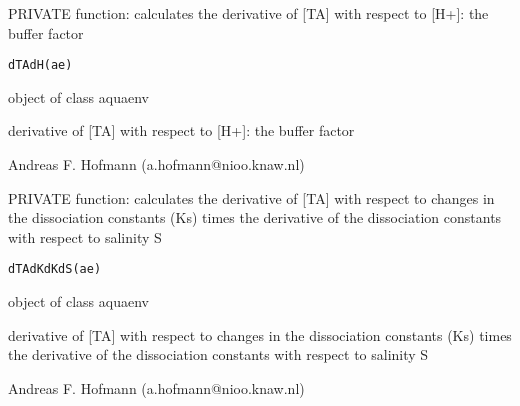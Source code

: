 \documentclass{article}
\begin{document}
\begin{Description}\relax
PRIVATE function: calculates the derivative of [TA] with respect to [H+]: the buffer factor
\end{Description}
\begin{Usage}
\begin{verbatim}dTAdH(ae)\end{verbatim}
\end{Usage}
\begin{Arguments}
\begin{ldescription}
\item[\code{ae }] object of class aquaenv
\end{ldescription}
\end{Arguments}
\begin{Value}
derivative of [TA] with respect to [H+]: the buffer factor
\end{Value}
\begin{Author}\relax
Andreas F. Hofmann (a.hofmann@nioo.knaw.nl)
\end{Author}

\begin{Description}\relax
PRIVATE function: calculates the derivative of [TA] with respect to changes in the dissociation constants (Ks) times the derivative of the dissociation constants with respect to salinity S
\end{Description}
\begin{Usage}
\begin{verbatim}dTAdKdKdS(ae)\end{verbatim}
\end{Usage}
\begin{Arguments}
\begin{ldescription}
\item[\code{ae }] object of class aquaenv
\end{ldescription}
\end{Arguments}
\begin{Value}
derivative of [TA] with respect to changes in the dissociation constants (Ks) times the derivative of the dissociation constants with respect to salinity S
\end{Value}
\begin{Author}\relax
Andreas F. Hofmann (a.hofmann@nioo.knaw.nl)
\end{Author}
\end{document}
